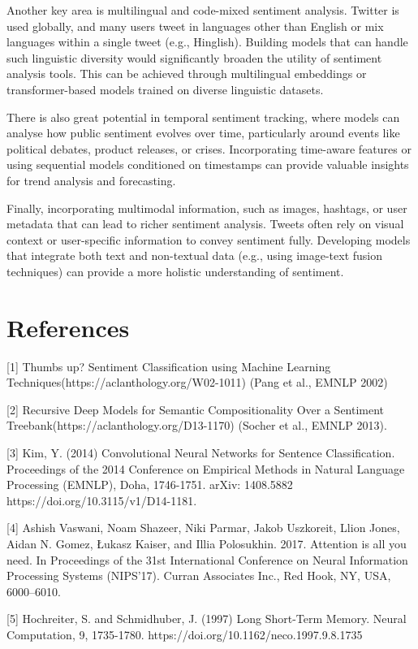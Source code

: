 \documentclass{article}
\begin{document}
Another key area is multilingual and code-mixed sentiment analysis. Twitter is used globally, and many users tweet in languages other than English or mix languages within a single tweet (e.g., Hinglish). Building models that can handle such linguistic diversity would significantly broaden the utility of sentiment analysis tools. This can be achieved through multilingual embeddings or transformer-based models trained on diverse linguistic datasets.

There is also great potential in temporal sentiment tracking, where models can analyse how public sentiment evolves over time, particularly around events like political debates, product releases, or crises. Incorporating time-aware features or using sequential models conditioned on timestamps can provide valuable insights for trend analysis and forecasting.

Finally, incorporating multimodal information, such as images, hashtags, or user metadata that can lead to richer sentiment analysis. Tweets often rely on visual context or user-specific information to convey sentiment fully. Developing models that integrate both text and non-textual data (e.g., using image-text fusion techniques) can provide a more holistic understanding of sentiment.

\section{References}

\small
[1] Thumbs up? Sentiment Classification using Machine Learning Techniques(https://aclanthology.org/W02-1011) (Pang et al., EMNLP 2002)

[2] Recursive Deep Models for Semantic Compositionality Over a Sentiment Treebank(https://aclanthology.org/D13-1170) (Socher et al., EMNLP 2013).

[3] Kim, Y. (2014) Convolutional Neural Networks for Sentence Classification. Proceedings of the 2014
Conference on Empirical Methods in Natural Language Processing (EMNLP), Doha, 1746-1751. arXiv:
1408.5882 https://doi.org/10.3115/v1/D14-1181.

[4] Ashish Vaswani, Noam Shazeer, Niki Parmar, Jakob Uszkoreit, Llion Jones, Aidan N. Gomez, Łukasz Kaiser, and Illia Polosukhin. 2017. Attention is all you need. In Proceedings of the 31st International Conference on Neural Information Processing Systems (NIPS’17). Curran Associates Inc., Red Hook, NY, USA, 6000–6010.

[5] Hochreiter, S. and Schmidhuber, J. (1997) Long Short-Term Memory. Neural Computation, 9, 1735-1780. https://doi.org/10.1162/neco.1997.9.8.1735
\end{document}

